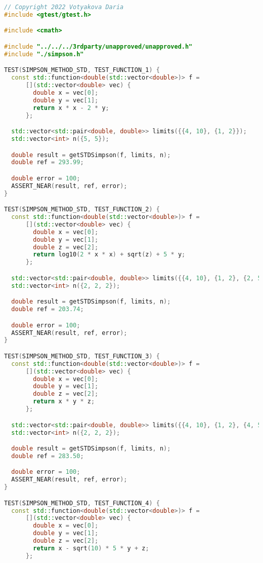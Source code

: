 \documentclass{report}
\begin{document}
\begin{lstlisting}[language=C++]
// Copyright 2022 Votyakova Daria
#include <gtest/gtest.h>

#include <cmath>

#include "../../../3rdparty/unapproved/unapproved.h"
#include "./simpson.h"

TEST(SIMPSON_METHOD_STD, TEST_FUNCTION_1) {
  const std::function<double(std::vector<double>)> f =
      [](std::vector<double> vec) {
        double x = vec[0];
        double y = vec[1];
        return x * x - 2 * y;
      };

  std::vector<std::pair<double, double>> limits({{4, 10}, {1, 2}});
  std::vector<int> n({5, 5});

  double result = getSTDSimpson(f, limits, n);
  double ref = 293.99;

  double error = 100;
  ASSERT_NEAR(result, ref, error);
}

TEST(SIMPSON_METHOD_STD, TEST_FUNCTION_2) {
  const std::function<double(std::vector<double>)> f =
      [](std::vector<double> vec) {
        double x = vec[0];
        double y = vec[1];
        double z = vec[2];
        return log10(2 * x * x) + sqrt(z) + 5 * y;
      };

  std::vector<std::pair<double, double>> limits({{4, 10}, {1, 2}, {2, 5}});
  std::vector<int> n({2, 2, 2});

  double result = getSTDSimpson(f, limits, n);
  double ref = 203.74;

  double error = 100;
  ASSERT_NEAR(result, ref, error);
}

TEST(SIMPSON_METHOD_STD, TEST_FUNCTION_3) {
  const std::function<double(std::vector<double>)> f =
      [](std::vector<double> vec) {
        double x = vec[0];
        double y = vec[1];
        double z = vec[2];
        return x * y * z;
      };

  std::vector<std::pair<double, double>> limits({{4, 10}, {1, 2}, {4, 5}});
  std::vector<int> n({2, 2, 2});

  double result = getSTDSimpson(f, limits, n);
  double ref = 283.50;

  double error = 100;
  ASSERT_NEAR(result, ref, error);
}

TEST(SIMPSON_METHOD_STD, TEST_FUNCTION_4) {
  const std::function<double(std::vector<double>)> f =
      [](std::vector<double> vec) {
        double x = vec[0];
        double y = vec[1];
        double z = vec[2];
        return x - sqrt(10) * 5 * y + z;
      };


\end{lstlisting}
\end{document}
